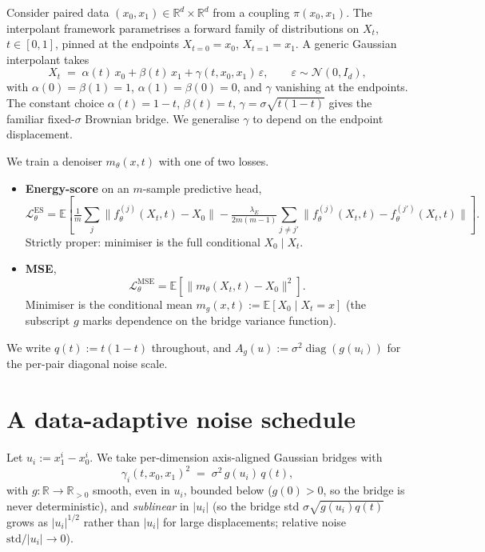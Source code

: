 \documentclass[11pt]{article}
\newcommand{\R}{\mathbb{R}}
\newcommand{\E}{\mathbb{E}}
\newcommand{\N}{\mathcal{N}}
\newcommand{\diag}{\operatorname{diag}}
\begin{document}
Consider paired data $(x_0, x_1) \in \R^d \times \R^d$ from a coupling
$\pi(x_0, x_1)$. The interpolant framework parametrises a forward family
of distributions on $X_t$, $t\in[0,1]$, pinned at the endpoints
$X_{t=0}=x_0$, $X_{t=1}=x_1$. A generic Gaussian interpolant takes
\begin{equation}
    X_t \;=\; \alpha(t)\, x_0 + \beta(t)\, x_1 + \gamma(t, x_0, x_1)\, \varepsilon,
    \qquad \varepsilon \sim \N(0, I_d),
    \label{eq:interp}
\end{equation}
with $\alpha(0)=\beta(1)=1$, $\alpha(1)=\beta(0)=0$, and
$\gamma$ vanishing at the endpoints. The constant choice
$\alpha(t)=1-t$, $\beta(t)=t$, $\gamma=\sigma\sqrt{t(1-t)}$ gives the
familiar fixed-$\sigma$ Brownian bridge. We generalise $\gamma$ to depend
on the endpoint displacement.

We train a denoiser $m_\theta(x, t)$ with one of two losses.
\begin{itemize}
    \item \textbf{Energy-score} on an $m$-sample predictive head,
    \begin{equation}
        \mathcal{L}^{\text{ES}}_\theta
        = \E\!\left[\tfrac{1}{m}{\sum_j} \|f_\theta^{(j)}(X_t,t)-X_0\|
          - \tfrac{\lambda_E}{2m(m-1)}{\sum_{j\ne j'}} \|f_\theta^{(j)}(X_t,t) - f_\theta^{(j')}(X_t,t)\|\right].
        \label{eq:energy}
    \end{equation}
    Strictly proper: minimiser is the full conditional $X_0\mid X_t$.
    \item \textbf{MSE},
    \begin{equation}
        \mathcal{L}^{\text{MSE}}_\theta = \E\!\left[\|m_\theta(X_t,t)-X_0\|^2\right].
        \label{eq:mse}
    \end{equation}
    Minimiser is the conditional mean
    $m_g(x, t) := \E[X_0\mid X_t = x]$ (the subscript $g$ marks
    dependence on the bridge variance function).
\end{itemize}
We write $q(t) := t(1-t)$ throughout, and
$A_g(u) := \sigma^2\diag(g(u_i))$ for the per-pair diagonal noise scale.

\section{A data-adaptive noise schedule}

Let $u_i := x_1^i - x_0^i$. We take per-dimension axis-aligned Gaussian
bridges with
\begin{equation}
    \gamma_i(t,x_0,x_1)^2 \;=\; \sigma^2\, g(u_i)\, q(t),
    \label{eq:gamma}
\end{equation}
with $g:\R\to\R_{>0}$ smooth, even in $u_i$, bounded below
($g(0)>0$, so the bridge is never deterministic), and \emph{sublinear} in
$|u_i|$ (so the bridge std $\sigma\sqrt{g(u_i)q(t)}$ grows as
$|u_i|^{1/2}$ rather than $|u_i|$ for large displacements; relative noise
$\mathrm{std}/|u_i| \to 0$).
\end{document}

